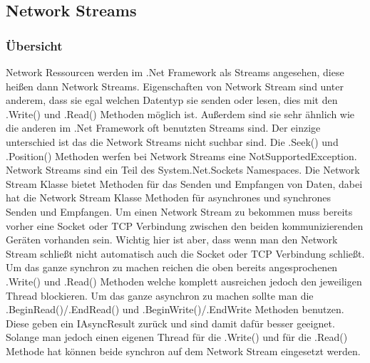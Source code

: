 \subsection{Network Streams} \label{ns}
\subsubsection{Übersicht}
Network Ressourcen werden im .Net Framework als Streams angesehen, diese heißen dann Network Streams. Eigenschaften von Network Stream sind unter anderem, dass sie egal welchen Datentyp sie senden oder lesen, dies mit den .Write() und .Read() Methoden möglich ist. Außerdem sind sie sehr ähnlich wie die anderen im .Net Framework oft benutzten Streams sind. Der einzige unterschied ist das die Network Streams nicht suchbar sind. Die .Seek() und .Position() Methoden werfen bei Network Streams eine NotSupportedException. Network Streams sind ein Teil des System.Net.Sockets Namespaces. Die Network Stream Klasse bietet Methoden für das Senden und Empfangen von Daten, dabei hat die Network Stream Klasse Methoden für asynchrones und synchrones Senden und Empfangen. Um einen Network Stream zu bekommen muss bereits vorher eine Socket oder TCP Verbindung zwischen den beiden kommunizierenden Geräten vorhanden sein. Wichtig hier ist aber, dass wenn man den Network Stream schließt nicht automatisch auch die Socket oder TCP Verbindung schließt. Um das ganze synchron zu machen reichen die oben bereits angesprochenen .Write() und .Read() Methoden welche komplett ausreichen jedoch den jeweiligen Thread blockieren. Um das ganze asynchron zu machen sollte man die .BeginRead()/.EndRead() und .BeginWrite()/.EndWrite Methoden benutzen. Diese geben ein IAsyncResult zurück und sind damit dafür besser geeignet. Solange man jedoch einen eigenen Thread für die .Write() und für die .Read() Methode hat können beide synchron auf dem Network Stream eingesetzt werden. 
